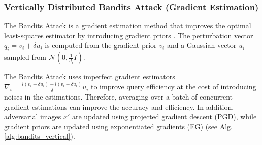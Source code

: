 
\subsubsection{Vertically Distributed Bandits Attack (Gradient Estimation)}

The Bandits Attack is a gradient estimation method that improves the optimal least-squares estimator by introducing gradient priors \cite{ilyas2018prior}. The perturbation vector $q_i=v_i+\delta u_i$ is computed from the gradient prior $v_i$ and a Gaussian vector $u_i$ sampled from $\mathcal{N}(0, \frac{1}{d_i}I)$. 

The Bandits Attack uses imperfect gradient estimators $\nabla_i= \frac{l(v_i+\delta u_i)-l(v_i-\delta u_i)}{\delta} u_i$ to improve query efficiency at the cost of introducing noises in the estimations. Therefore, averaging over a batch of concurrent gradient estimations can improve the accuracy and efficiency. In addition, adversarial images $x'$ are updated using projected gradient descent (PGD), while gradient priors are updated using exponentiated gradients (EG) \cite{pmlr-v117-ghai20a} (see Alg. \ref{alg:bandits_vertical}).




